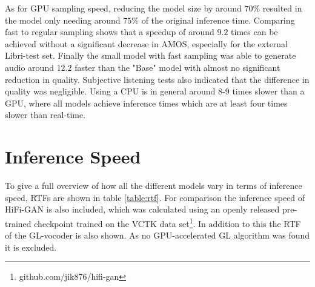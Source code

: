 \documentclass{report}
\begin{document}
As for GPU sampling speed, reducing the model size by around $70\%$ resulted in the model only needing around $75\%$ of the original inference time. Comparing fast to regular sampling shows that a speedup of around $9.2$ times can be achieved without a significant decrease in AMOS, especially for the external Libri-test set. Finally the small model with fast sampling was able to generate audio around $12.2$ faster than the "Base" model with almost no significant reduction in quality. Subjective listening tests also indicated that the difference in quality was negligible. Using a CPU is in general around 8-9 times slower than a GPU, where all models achieve inference times which are at least four times slower than real-time.

\section{Inference Speed} \label{sec:speed}

To give a full overview of how all the different models vary in terms of inference speed, RTFs are shown in table \ref{table:rtf}. For comparison the inference speed of HiFi-GAN is also included, which was calculated using an openly released pre-trained checkpoint trained on the VCTK \cite{veaux2017cstr} data set\footnote{github.com/jik876/hifi-gan}. In addition to this the RTF of the GL-vocoder is also shown. As no GPU-accelerated GL algorithm was found it is excluded.
\end{document}
